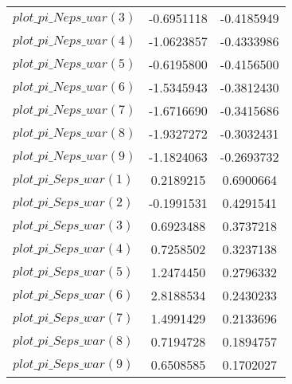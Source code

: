 \begin{center}
\begin{longtable}{lcc}
$plot\_pi\_N eps\_war (3)   $	 & 	     -0.6951118	 & 	     -0.4185949 \\ 
$plot\_pi\_N eps\_war (4)   $	 & 	     -1.0623857	 & 	     -0.4333986 \\ 
$plot\_pi\_N eps\_war (5)   $	 & 	     -0.6195800	 & 	     -0.4156500 \\ 
$plot\_pi\_N eps\_war (6)   $	 & 	     -1.5345943	 & 	     -0.3812430 \\ 
$plot\_pi\_N eps\_war (7)   $	 & 	     -1.6716690	 & 	     -0.3415686 \\ 
$plot\_pi\_N eps\_war (8)   $	 & 	     -1.9327272	 & 	     -0.3032431 \\ 
$plot\_pi\_N eps\_war (9)   $	 & 	     -1.1824063	 & 	     -0.2693732 \\ 
$plot\_pi\_S eps\_war (1)   $	 & 	      0.2189215	 & 	      0.6900664 \\ 
$plot\_pi\_S eps\_war (2)   $	 & 	     -0.1991531	 & 	      0.4291541 \\ 
$plot\_pi\_S eps\_war (3)   $	 & 	      0.6923488	 & 	      0.3737218 \\ 
$plot\_pi\_S eps\_war (4)   $	 & 	      0.7258502	 & 	      0.3237138 \\ 
$plot\_pi\_S eps\_war (5)   $	 & 	      1.2474450	 & 	      0.2796332 \\ 
$plot\_pi\_S eps\_war (6)   $	 & 	      2.8188534	 & 	      0.2430233 \\ 
$plot\_pi\_S eps\_war (7)   $	 & 	      1.4991429	 & 	      0.2133696 \\ 
$plot\_pi\_S eps\_war (8)   $	 & 	      0.7194728	 & 	      0.1894757 \\ 
$plot\_pi\_S eps\_war (9)   $	 & 	      0.6508585	 & 	      0.1702027 \\ 
\end{longtable}
 \end{center}
